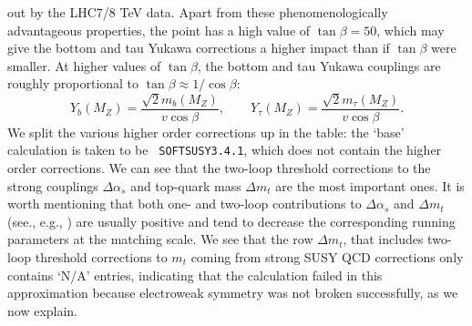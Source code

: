 \documentclass[final,3p,times,pdflatex]{elsarticle}
\begin{document}
out 
by the LHC7/8 TeV data. Apart from these phenomenologically advantageous
properties, the point has a high value of $\tan \beta=50$, which may give the 
bottom and tau Yukawa corrections a higher impact than if $\tan \beta$ were
smaller. At higher values of $\tan \beta$, the bottom and tau Yukawa couplings
are roughly proportional to $\tan \beta \approx 1/\cos{\beta}$:
\begin{equation}
Y_b(M_Z) = \frac{\sqrt{2}m_b(M_Z)}{v \cos \beta}, \qquad
Y_\tau(M_Z) = \frac{\sqrt{2}m_\tau(M_Z)}{v \cos \beta}.
\end{equation}
We split the various higher order corrections up in
the table: the `base' calculation is taken to be {\tt
  SOFTSUSY3.4.1}, which does not contain the higher order corrections. 
We can see that the two-loop threshold corrections to the strong couplings $\Delta \alpha_s$ and top-quark mass $\Delta m_t$ are the most important ones. 
It is worth mentioning that both  one- and two-loop contributions to $\Delta \alpha_s$ and $\Delta m_t$ (see., e.g., \cite{Pierce:1996zz,Bednyakov:2010ni}) are usually positive and tend to decrease the corresponding running parameters at the matching scale. 
We see that the row $\Delta m_t$, that includes two-loop threshold corrections
to $m_t$ coming from strong SUSY QCD corrections only contains `N/A' entries,
indicating that the calculation failed in this approximation because
electroweak symmetry was not broken successfully, as we now explain. 
\end{document}
